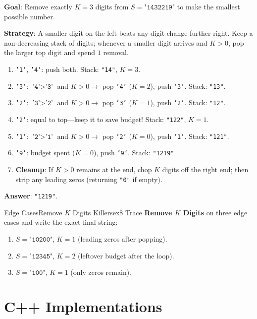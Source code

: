 \documentclass[11pt,a4paper]{article}
\theoremstyle{definition}
\begin{document}
\textbf{Goal}: Remove exactly $K = 3$ digits from $S = \texttt{"1432219"}$ to make the smallest possible number.

\textbf{Strategy}: A smaller digit on the left beats any digit change further right. Keep a non-decreasing stack of digits; whenever a smaller digit arrives and $K > 0$, pop the larger top digit and spend $1$ removal.

\begin{enumerate}
    \item \texttt{'1'}, \texttt{'4'}: push both. Stack: \texttt{"14"}, $K = 3$.
    \item \texttt{'3'}: $\texttt{'4'} > \texttt{'3'}$ and $K > 0 \to$ pop \texttt{'4'} ($K = 2$), push \texttt{'3'}. Stack: \texttt{"13"}.
    \item \texttt{'2'}: $\texttt{'3'} > \texttt{'2'}$ and $K > 0 \to$ pop \texttt{'3'} ($K = 1$), push \texttt{'2'}. Stack: \texttt{"12"}.
    \item \texttt{'2'}: equal to top---keep it to save budget! Stack: \texttt{"122"}, $K = 1$.
    \item \texttt{'1'}: $\texttt{'2'} > \texttt{'1'}$ and $K > 0 \to$ pop \texttt{'2'} ($K = 0$), push \texttt{'1'}. Stack: \texttt{"121"}.
    \item \texttt{'9'}: budget spent ($K = 0$), push \texttt{'9'}. Stack: \texttt{"1219"}.
    \item \textbf{Cleanup}: If $K > 0$ remains at the end, chop $K$ digits off the right end; then strip any leading zeros (returning \texttt{"0"} if empty).
\end{enumerate}

\textbf{Answer}: \texttt{"1219"}.

\begin{tryitbox}{Edge Cases}{Remove $K$ Digits Killers}{ex8}
Trace \textbf{Remove $K$ Digits} on three edge cases and write the exact final string:
\begin{enumerate}
    \item $S = \texttt{"10200"}$, $K = 1$ (leading zeros after popping).
    \item $S = \texttt{"12345"}$, $K = 2$ (leftover budget after the loop).
    \item $S = \texttt{"100"}$, $K = 1$ (only zeros remain).
\end{enumerate}
\end{tryitbox}

\section{C++ Implementations}
\end{document}
